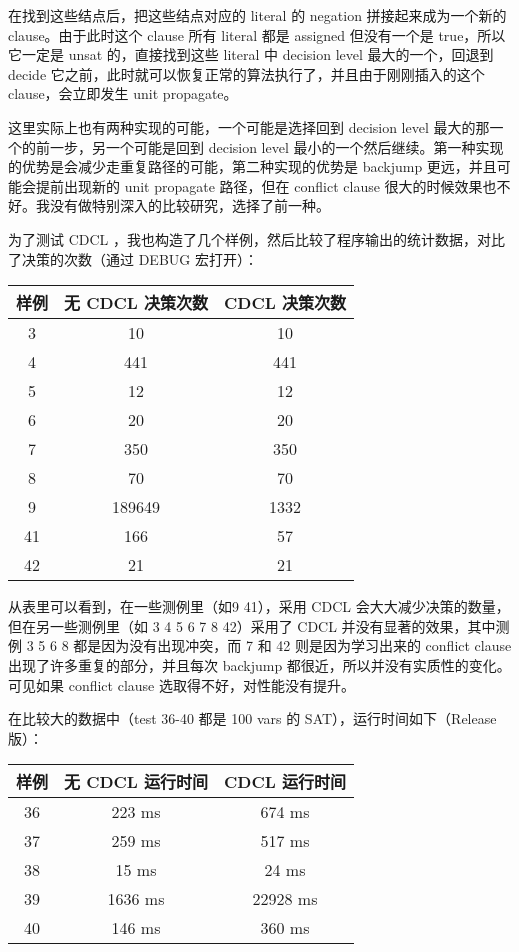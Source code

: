 \documentclass[11pt,a4paper]{ctexart}
\begin{document}
在找到这些结点后，把这些结点对应的 literal 的 negation 拼接起来成为一个新的 clause。由于此时这个 clause 所有 literal 都是 assigned 但没有一个是 true，所以它一定是 unsat 的，直接找到这些 literal 中 decision level 最大的一个，回退到 decide 它之前，此时就可以恢复正常的算法执行了，并且由于刚刚插入的这个 clause，会立即发生 unit propagate。

这里实际上也有两种实现的可能，一个可能是选择回到 decision level 最大的那一个的前一步，另一个可能是回到 decision level 最小的一个然后继续。第一种实现的优势是会减少走重复路径的可能，第二种实现的优势是 backjump 更远，并且可能会提前出现新的 unit propagate 路径，但在 conflict clause 很大的时候效果也不好。我没有做特别深入的比较研究，选择了前一种。

为了测试 CDCL ，我也构造了几个样例，然后比较了程序输出的统计数据，对比了决策的次数（通过 DEBUG 宏打开）：

\begin{center}
\begin{tabular}{|c|c|c|}
    \hline
    样例 & 无 CDCL 决策次数 & CDCL 决策次数 \\
    \hline
    3 & 10 & 10 \\
    \hline
    4 & 441 & 441 \\
    \hline
    5 & 12 & 12 \\
    \hline
    6 & 20 & 20 \\
    \hline
    7 & 350 & 350 \\
    \hline
    8 & 70 & 70 \\
    \hline
    9 & 189649 & 1332 \\
    \hline
    41 & 166 & 57 \\
    \hline
    42 & 21 & 21 \\
    \hline
\end{tabular}
\end{center}

从表里可以看到，在一些测例里（如9 41），采用 CDCL 会大大减少决策的数量，但在另一些测例里（如 3 4 5 6 7 8 42）采用了 CDCL 并没有显著的效果，其中测例 3 5 6 8 都是因为没有出现冲突，而 7 和 42 则是因为学习出来的 conflict clause 出现了许多重复的部分，并且每次 backjump 都很近，所以并没有实质性的变化。可见如果 conflict clause 选取得不好，对性能没有提升。

在比较大的数据中（test 36-40 都是 100 vars 的 SAT），运行时间如下（Release 版）：

\begin{center}
\begin{tabular}{|c|c|c|}
    \hline
    样例 & 无 CDCL 运行时间 & CDCL 运行时间 \\
    \hline
    36 & 223 ms & 674 ms \\
    \hline
    37 & 259 ms & 517 ms \\
    \hline
    38 & 15 ms & 24 ms \\
    \hline
    39 & 1636 ms & 22928 ms \\
    \hline
    40 & 146 ms & 360 ms \\
    \hline
\end{tabular}
\end{center}
\end{document}
